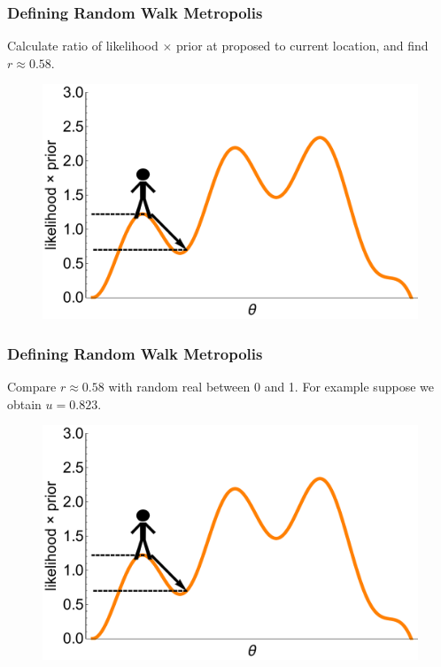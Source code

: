 \documentclass[handout]{beamer}
\begin{document}
\begin{frame}
\frametitle{Defining Random Walk Metropolis}
Calculate ratio of likelihood $\times$ prior at proposed to current location, and find $r \approx 0.58$.

\begin{figure}[ht]
\centerline{\includegraphics[width=1\textwidth]{animations_figures/lec4_metropolisDefinition4.pdf}}
\end{figure}

\end{frame}

\begin{frame}
\frametitle{Defining Random Walk Metropolis}
Compare $r \approx 0.58$ with random real between 0 and 1. For example suppose we obtain $u = 0.823$.

\begin{figure}[ht]
\centerline{\includegraphics[width=1\textwidth]{animations_figures/lec4_metropolisDefinition4.pdf}}
\end{figure}

\end{frame}
\end{document}
